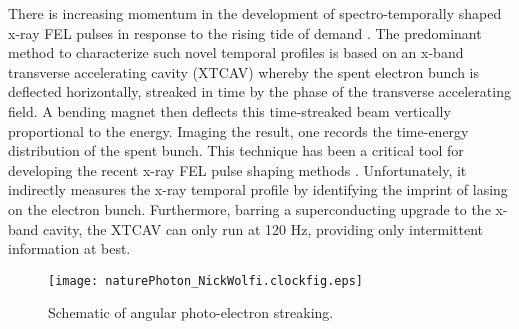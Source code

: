 
There is increasing momentum in the development of spectro-temporally shaped x-ray FEL pulses \cite{eehg2009,Lutman13_twocolor,Marinelli13_twocolor,Allaria2014,Marinelli2015,Hemsing2016,Prince2016,Lutman2016,LutmanFreshSlice2016,Marinelli2016} in response to the rising tide of demand \cite{Cederbaum2008,Mukamel2007,Biggs2012,Mukamel2013,4WaveMixing,TIGER2015,ArtemFOA}.
The predominant method to characterize such novel temporal profiles is based on an x-band transverse accelerating cavity (XTCAV) \cite{xtcav2014} whereby the spent electron bunch is deflected horizontally, streaked in time by the phase of the transverse accelerating field.
A bending magnet then deflects this time-streaked beam vertically proportional to the energy.
Imaging the result, one records the time-energy distribution of the spent bunch.
This technique has been a critical tool for developing the recent x-ray FEL pulse shaping methods \cite{Marinelli2015,Marinelli2016,LutmanFreshSlice2016,Lutman2016}.
Unfortunately, it indirectly measures the x-ray temporal profile by identifying the imprint of lasing on the electron bunch.
Furthermore, barring a superconducting upgrade to the x-band cavity, the XTCAV can only run at 120 Hz, providing only intermittent information at best.

\begin{figure}[b]
\vspace{-\baselineskip}
\centerline{
	\texttt{[image: naturePhoton\_NickWolfi.clockfig.eps]}
}
\vspace{-\baselineskip}
\caption{
	\label{streakingschematic} 
	Schematic of angular photo-electron streaking. \cite{Nick2018}
}
\end{figure}

